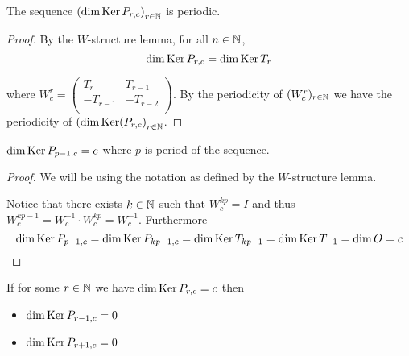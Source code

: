 \begin{proposition}
  The sequence $\left(\dim \operatorname{Ker} P_{r,c}\right)_{r\in\mathbb{N}}$
  is periodic.
\end{proposition}

\begin{proof}
  By the $W$-structure lemma, for all $n\in\mathbb{N}$,
  \[
  \dim\operatorname{Ker} P_{r,c}
  =
  \dim\operatorname{Ker} T_{r}
  \]

  where $W_{c}^{r}=\left(\begin{smallmatrix} T_{r} & T_{r-1}  \\ -T_{r-1} & -T_{r-2} \\\end{smallmatrix}\right)$.
  By the periodicity of $(W_{c}^{r})_{r\in\mathbb{N}}$ we have the
  periodicity of $\left(\dim\operatorname{Ker}(P_{r,c}\right)_{r\in\mathbb{N}}$.
\end{proof}

\begin{lemma}
  $\dim\operatorname{Ker} P_{p-1,c} = c$ where $p$ is period of the sequence.
\end{lemma}

\begin{proof}
  We will be using the notation as defined by the $W$-structure lemma.

  Notice that there exists $k\in\mathbb{N}$ such that $W_{c}^{kp} = I$ and
  thus $W_{c}^{kp-1} = W_{c}^{-1} \cdot W_{c}^{kp} = W_{c}^{-1}$.
  Furthermore
  \[
  \dim\operatorname{Ker} P_{p-1,c}
  =
  \dim\operatorname{Ker} P_{kp-1,c}
  =
  \dim\operatorname{Ker} T_{kp-1}
  =
  \dim\operatorname{Ker} T_{-1}
  =
  \dim O
  = c
  \]
\end{proof}

\begin{lemma}
  If for some $r\in\mathbb{N}$ we have $\dim\operatorname{Ker} P_{r,c} = c$ then
  \begin{itemize}
    \item $\dim\operatorname{Ker} P_{r-1,c} = 0$
    \item $\dim\operatorname{Ker} P_{r+1,c} = 0$
  \end{itemize}
\end{lemma}

